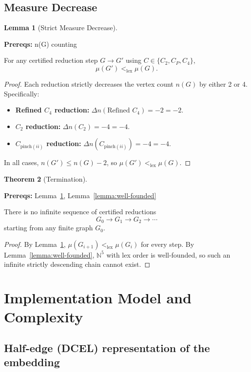 \documentclass[12pt]{article}
\theoremstyle{definition}
\newtheorem{theorem}{Theorem}
\newtheorem{lemma}[theorem]{Lemma}
\newcommand{\prereq}[1]{\par\noindent\textbf{Prereqs:} #1\par}
\newcommand{\CtwoDelta}{-4}
\newcommand{\RefinedCfourDelta}{-2}
\newcommand{\PinchIIGadgetDelta}{-4}
\begin{document}
\subsection{Measure Decrease}

\begin{lemma}[Strict Measure Decrease]
\label{lemma:measure-decrease}
\prereq{n(G) counting}
For any certified reduction step $G \to G'$ using $C \in \{C_2, C_P, C_4\}$,
\[
\mu(G') <_{\text{lex}} \mu(G).
\]
\end{lemma}

\begin{proof}
Each reduction strictly decreases the vertex count $n(G)$ by either 2 or 4. Specifically:
\begin{itemize}
    \item \textbf{Refined $C_4$ reduction:} $\Delta n(\text{Refined } C_4) = \RefinedCfourDelta = -2$.
    \item \textbf{$C_2$ reduction:} $\Delta n(C_2) = \CtwoDelta = -4$.
    \item \textbf{$C_{\text{pinch}(ii)}$ reduction:} $\Delta n(C_{\text{pinch}(ii)}) = \PinchIIGadgetDelta = -4$.
\end{itemize}

In all cases, $n(G') \le n(G) - 2$, so $\mu(G') <_{\text{lex}} \mu(G)$.
\end{proof}

\begin{theorem}[Termination]
\label{thm:termination}
\prereq{Lemma~\ref{lemma:measure-decrease}, Lemma~\ref{lemma:well-founded}}
There is no infinite sequence of certified reductions
\[
G_0 \to G_1 \to G_2 \to \cdots
\]
starting from any finite graph $G_0$.
\end{theorem}

\begin{proof}
By Lemma~\ref{lemma:measure-decrease}, $\mu(G_{i+1}) <_{\text{lex}} \mu(G_i)$ for every step. By Lemma~\ref{lemma:well-founded}, $\mathbb{N}^5$ with lex order is well-founded, so such an infinite strictly descending chain cannot exist.
\end{proof}

\section{Implementation Model and Complexity}
\label{sec:complexity}

\subsection{Half-edge (DCEL) representation of the embedding}
\label{subsec:dcel}
\end{document}
